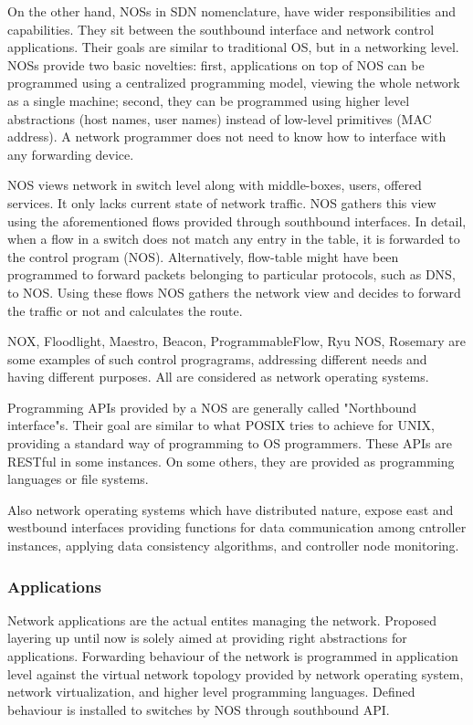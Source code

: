 \documentclass[12pt,journal,compsoc]{IEEEtran}
\begin{document}
On the other hand, NOSs in SDN nomenclature, have wider responsibilities and capabilities.
 They sit between the southbound interface and network control applications.
 Their goals are similar to traditional OS, but in a networking 
level. NOSs provide two basic novelties: first, applications on top of NOS can 
be programmed using a centralized programming model, viewing the whole network as 
a single machine; second, they can be programmed using higher level
abstractions (host names, user names) instead of low-level primitives (MAC address).
 A network programmer does not need to know how to interface with any forwarding 
device.

NOS views network in switch level along with middle-boxes, users, offered services.
 It only lacks current state of network traffic. NOS gathers this view using 
the aforementioned flows provided through southbound interfaces. In detail, when a
 flow in a switch does not match any entry in the table, it is forwarded 
to the control program (NOS). Alternatively, flow-table might have been programmed 
to forward packets belonging to particular protocols, such as DNS, to NOS. Using 
these flows NOS gathers the network view and decides to forward the traffic or not
 and calculates the route.

 NOX, Floodlight, Maestro, Beacon, ProgrammableFlow, Ryu NOS, Rosemary are some 
examples of such control progragrams, addressing different needs and having 
different purposes. All are considered as network operating systems.

Programming APIs provided by a NOS are generally called "Northbound interface"s.
 Their goal are similar to what POSIX tries to achieve for UNIX, providing a 
standard way of programming to OS programmers. These APIs are RESTful in some 
instances. On some others, they are provided as programming languages or file 
systems.

Also network operating systems which have distributed nature, expose east and 
westbound interfaces providing functions for data communication among 
cntroller instances, applying data consistency algorithms, and controller node 
monitoring.

\subsubsection{Applications}
 Network applications are the actual entites managing the network. Proposed 
layering up until now is solely aimed at providing right abstractions for 
applications. Forwarding behaviour of the network is programmed in application 
level against the virtual network topology provided by network operating system,
 network virtualization, and higher level programming languages. Defined behaviour 
is installed to switches by NOS through southbound API.
\end{document}
